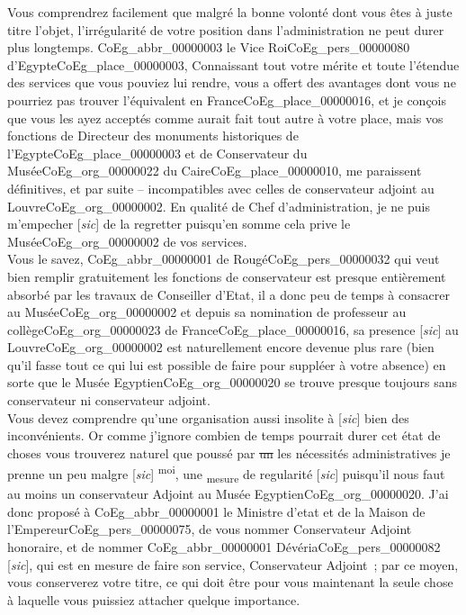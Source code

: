 \documentclass{book}
\begin{document}
{{\indent Vous comprendrez facilement que malgré la bonne volonté dont vous êtes à juste titre l’objet, l’irrégularité de votre position dans l’administration ne peut durer plus longtemps. \gls{CoEg_abbr_00000003} le Vice Roi\gls{CoEg_pers_00000080} d’Egypte\gls{CoEg_place_00000003}, Connaissant tout votre mérite et toute l’étendue des services que vous pouviez lui rendre, vous a offert des avantages dont vous ne pourriez pas trouver l’équivalent en France\gls{CoEg_place_00000016}, et je conçois que vous les ayez acceptés comme aurait fait tout autre à votre place, mais vos fonctions de Directeur des monuments historiques de l’Egypte\gls{CoEg_place_00000003} et de Conservateur du Musée\gls{CoEg_org_00000022} du Caire\gls{CoEg_place_00000010}, me paraissent définitives, et par suite – incompatibles avec celles de conservateur adjoint au Louvre\gls{CoEg_org_00000002}. En qualité de Chef d’administration, je ne puis m’empecher [\textit{sic}] de la regretter puisqu’en somme cela prive le Musée\gls{CoEg_org_00000002} de vos services.\\
\indent Vous le savez, \gls{CoEg_abbr_00000001} de Rougé\gls{CoEg_pers_00000032} qui veut bien remplir gratuitement les fonctions de conservateur est presque entièrement absorbé par les travaux de Conseiller d’Etat, il a donc peu de temps à consacrer au Musée\gls{CoEg_org_00000002} et depuis sa nomination de professeur au collège\gls{CoEg_org_00000023} de France\gls{CoEg_place_00000016}, sa presence [\textit{sic}] au Louvre\gls{CoEg_org_00000002} est naturellement encore devenue plus rare (bien qu’il fasse tout ce qui lui est possible de faire pour suppléer à votre absence) en sorte que le Musée Egyptien\gls{CoEg_org_00000020} se trouve presque toujours sans conservateur ni conservateur adjoint.\\
\indent Vous devez comprendre qu’une organisation aussi insolite à {[\textit{sic}]} bien des inconvénients. Or comme j’ignore combien de temps pourrait durer cet état de choses vous trouverez naturel que poussé par \sout{un} les nécessités administratives je prenne un peu malgre [\textit{sic}] \textsuperscript{moi}, une \textsubscript{mesure} de regularité [\textit{sic}] puisqu’il nous faut au moins un conservateur Adjoint au Musée Egyptien\gls{CoEg_org_00000020}. J’ai donc proposé à \gls{CoEg_abbr_00000001} le Ministre d’etat et de la Maison de l’Empereur\gls{CoEg_pers_00000075}, de vous nommer Conservateur Adjoint honoraire, et de nommer \gls{CoEg_abbr_00000001} Dévéria\gls{CoEg_pers_00000082} {[\textit{sic}]}, qui est en mesure de faire son service, Conservateur Adjoint~; par ce moyen, vous conserverez votre titre, ce qui doit être pour vous maintenant la seule chose à laquelle vous puissiez attacher quelque importance.\\
}}
\end{document}
